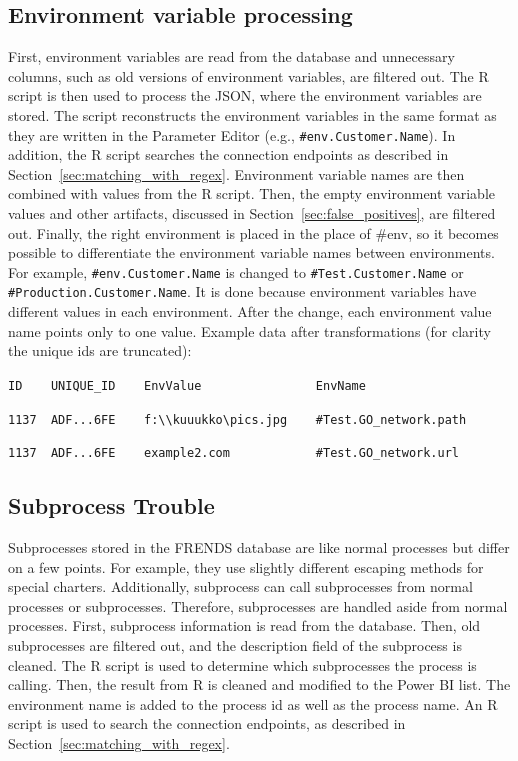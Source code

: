 \documentclass[english, 12pt, a4paper, sci, utf8, a-2b, online, obeyspaces]{aaltothesis}
\begin{document}
\subsection{Environment variable processing}
\label{sec:environment_variables_processing}
First, environment variables are read from the database and unnecessary columns, such as old versions of environment variables, are filtered out. The R script is then used to process the JSON, where the environment variables are stored. The script reconstructs the environment variables in the same format as they are written in the Parameter Editor (e.g., \verb|#env.Customer.Name|). In addition, the R script searches the connection endpoints as described in Section~\ref{sec:matching_with_regex}. Environment variable names are then combined with values from the R script. Then, the empty environment variable values and other artifacts, discussed in Section~\ref{sec:false_positives}, are filtered out. Finally, the right environment is placed in the place of \#env, so it becomes possible to differentiate the environment variable names between environments. For example, \verb|#env.Customer.Name| is changed to \verb|#Test.Customer.Name| or \verb|#Production.Customer.Name|. It is done because environment variables have different values in each environment. After the change, each environment value name points only to one value. Example data after transformations (for clarity the unique ids are truncated):

\nopagebreak
\verb=ID    UNIQUE_ID    EnvValue                EnvName=

\nopagebreak
\verb=1137  ADF...6FE    f:\\kuuukko\pics.jpg    #Test.GO_network.path=

\nopagebreak
\verb=1137  ADF...6FE    example2.com            #Test.GO_network.url=

\subsection{Subprocess Trouble}
\label{sec:ubprocess_troubles}
Subprocesses stored in the FRENDS database are like normal processes but differ on a few points. For example, they use slightly different escaping methods for special charters. Additionally, subprocess can call subprocesses from normal processes or subprocesses. Therefore, subprocesses are handled aside from normal processes. First, subprocess information is read from the database. Then, old subprocesses are filtered out, and the description field of the subprocess is cleaned. The R script is used to determine which subprocesses the process is calling. Then, the result from R is cleaned and modified to the Power BI list. The environment name is added to the process id as well as the process name. An R script is used to search the connection endpoints, as described in Section~\ref{sec:matching_with_regex}.
\end{document}

